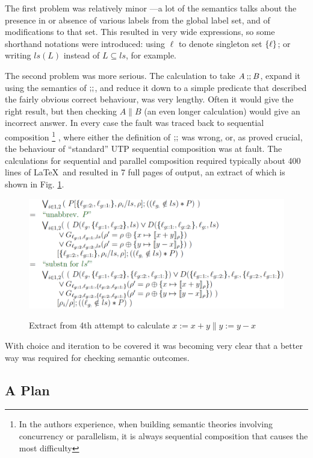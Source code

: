 The first problem was relatively minor
---a lot of the semantics talks about the presence in or absence of
various labels from the global label set, and of modifications to that set.
This resulted in very wide expressions,
so some shorthand notations were introduced:
using $\ell$ to denote singleton set $\{{\ell}\}$;
or writing $ls(L)$ instead of $L \subseteq ls$, for example.

The second problem was more serious.
The calculation to take $A \mathbin{\mathbf{;\!;}} B$,
expand it using the semantics of $\mathbin{\mathbf{;\!;}}$,
and reduce it down to a simple predicate that described the fairly obvious
correct behaviour,
was very lengthy.
Often it would give the right result,
but then checking $A \parallel B$ (an even longer calculation)
would give an incorrect answer.
In every case the fault was traced back to sequential composition%
\footnote{
In the authors experience,
when building semantic theories involving concurrency or parallelism,
it is always sequential composition that causes the most difficulty
}
,
where either the definition of $\mathbin{\mathbf{;\!;}}$ was wrong,
or, as proved crucial,
the behaviour of ``standard'' UTP sequential composition
was at fault.
The calculations for sequential and parallel composition
required typically about 400 lines of \LaTeX\ and resulted
in 7 full pages of output,
an extract of which is shown in Fig. \ref{fig:attempt4}.

\begin{figure}
  \centering
  \includegraphics[width=4.5in]{Attempt4.eps}\\
  \caption{Extract from 4th attempt to calculate $x:=x+y \parallel y:=y-x$}
  \label{fig:attempt4}
\end{figure}

With choice and iteration to be covered
it was becoming very clear that a better way was required
for checking semantic outcomes.

\subsection{A Plan}\label{ssec:plan}

